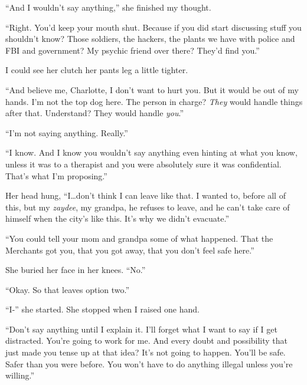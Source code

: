 ``And I wouldn't say anything,'' she finished my thought.



``Right.  You'd keep your mouth shut.  Because if you did start discussing stuff you shouldn't know?  Those soldiers, the hackers, the plants we have with police and FBI and government?  My psychic friend over there?  They'd find you.''



I could see her clutch her pants leg a little tighter.



``And believe me, Charlotte, I don't want to hurt you.  But it would be out of my hands.  I'm not the top dog here.  The person in charge?  \emph{They} would handle things after that.  Understand?  They would handle \emph{you}.''



``I'm not saying anything.  Really.''



``I know.  And I know you wouldn't say anything even hinting at what you know, unless it was to a therapist and you were absolutely sure it was confidential.  That's what I'm proposing.''



Her head hung, ``I\ldots don't think I can leave like that.  I wanted to, before all of this, but my \emph{zaydee}, my grandpa, he refuses to leave, and he can't take care of himself when the city's like this.  It's why we didn't evacuate.''



``You could tell your mom and grandpa some of what happened.  That the Merchants got you, that you got away, that you don't feel safe here.''



She buried her face in her knees.  ``No.''



``Okay.  So that leaves option two.''



``I-'' she started.  She stopped when I raised one hand.



``Don't say anything until I explain it.  I'll forget what I want to say if I get distracted.  You're going to work for me.  And every doubt and possibility that just made you tense up at that idea?  It's not going to happen.  You'll be safe.  Safer than you were before.  You won't have to do anything illegal unless you're willing.''



